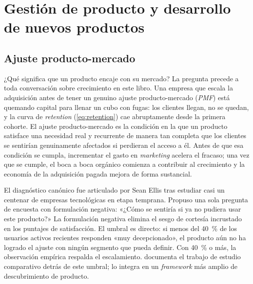 \chapter{Gestión de producto y desarrollo de nuevos productos}\label{ch:product-management}


\section{Ajuste producto-mercado}\label{sec:product-market-fit}

¿Qué significa que un producto encaje con su mercado? La pregunta precede a toda
conversación sobre crecimiento en este libro. Una empresa que escala la adquisición
antes de tener un genuino ajuste producto-mercado (\emph{PMF}) está quemando capital
para llenar un cubo con fugas: los clientes llegan, no se quedan, y la curva de
\emph{retention} (\cref{eq:retention}) cae abruptamente desde la primera cohorte.
El ajuste producto-mercado es la condición en la que un producto satisface una necesidad
real y recurrente de manera tan completa que los clientes se sentirían genuinamente
afectados si perdieran el acceso a él. Antes de que esa condición se cumpla, incrementar
el gasto en \emph{marketing} acelera el fracaso; una vez que se cumple, el boca a boca
orgánico comienza a contribuir al crecimiento y la economía de la adquisición pagada
mejora de forma sustancial.

El diagnóstico canónico fue articulado por Sean Ellis tras estudiar casi un centenar de
empresas tecnológicas en etapa temprana. Propuso una sola pregunta de encuesta con
formulación negativa: «¿Cómo se sentiría si ya no pudiera usar este producto?» La
formulación negativa elimina el sesgo de cortesía incrustado en los puntajes de
satisfacción. El umbral es directo: si menos del \qty{40}{\percent} de los usuarios
activos recientes responden «muy decepcionado», el producto aún no ha logrado el ajuste
con ningún segmento que pueda definir. Con \qty{40}{\percent} o más, la observación
empírica respalda el escalamiento.
\textcite{ellis2017hacking} documenta el trabajo de estudio comparativo detrás de este
umbral; \textcite{cagan2018inspired} lo integra en un \emph{framework} más amplio de
descubrimiento de producto.

